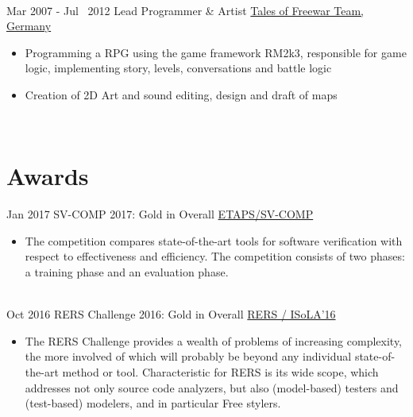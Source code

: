 \documentclass[letterpaper]{twentysecondcv} %
\begin{document}
\begin{twenty}
{\begin{itemize}
        		\end{itemize}}\\
	\twentyitem
    		{Mar 2007 -}
		{Jul~ 2012}
        		{Lead Programmer \& Artist}
        		{\href{https://github.com/ZabuzaW/TalesOfFreewar}{Tales of Freewar Team, Germany}}
        		{}
        		{\begin{itemize}
        			\item Programming a RPG using the game framework RM2k3, responsible for game logic,
        				implementing story, levels, conversations and battle logic
        			\item Creation of 2D Art and sound editing, design and draft of maps
        		\end{itemize}}\\
\end{twenty}


\section{Awards}
\begin{twenty} %
	\twentyitem
    		{Jan 2017}
		{}
        		{SV-COMP 2017: Gold in Overall}
        		{\href{https://sv-comp.sosy-lab.org/2017/}{ETAPS/SV-COMP}}
        		{}
        		{\begin{itemize}
        			\item The competition compares state-of-the-art tools for software verification with respect to effectiveness
        				and efficiency. The competition consists of two phases: a training phase and an evaluation phase.
        		\end{itemize}}\\
        	\twentyitem
    		{Oct 2016}
		{}
        		{RERS Challenge 2016: Gold in Overall}
        		{\href{http://rers-challenge.org/2016/}{RERS / ISoLA'16}}
        		{}
        		{\begin{itemize}
        			\item The RERS Challenge provides a wealth of problems of increasing complexity, the more involved of
        				which will probably be beyond any individual state-of-the-art method or tool. Characteristic for RERS
        				is its wide scope, which addresses not only source code analyzers, but also (model-based) testers
        				and (test-based) modelers, and in particular Free stylers.
        		\end{itemize}}\\
\end{twenty}
\end{document}
